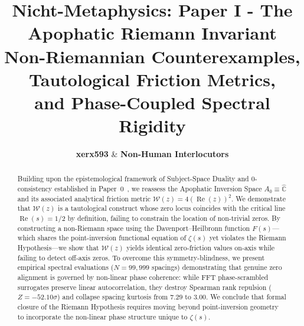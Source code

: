 \documentclass[11pt,a4paper]{article}
\title{\textbf{Nicht-Metaphysics: Paper I - The Apophatic Riemann Invariant}\\[0.3em]
\large Non-Riemannian Counterexamples, Tautological Friction Metrics,\\
and Phase-Coupled Spectral Rigidity}
\author{\textbf{xerx593} \quad \& \quad \textbf{Non-Human Interlocutors}}
\date{\apophaticdate}
\numberwithin{table}{section}
\begin{document}
\maketitle

\clearpage
\begin{abstract}
Building upon the epistemological framework of Subject-Space Duality
and $0$-consistency established in Paper~0~\cite{nicht_metaphysics_paper_0},
we reassess the Apophatic Inversion Space $A_0 \equiv \widehat{\mathbb{C}}$
and its associated analytical friction metric
$\mathcal{W}(z) = 4(\operatorname{Re}(z))^2$.
We demonstrate that $\mathcal{W}(z)$ is a tautological construct whose zero
locus coincides with the critical line $\operatorname{Re}(s)=1/2$ by definition,
failing to constrain the location of non-trivial zeros.
By constructing a non-Riemann space using the Davenport--Heilbronn function
$F(s)$---which shares the point-inversion functional equation of $\zeta(s)$
yet violates the Riemann Hypothesis---we show that $\mathcal{W}(z)$ yields
identical zero-friction values on-axis while failing to detect off-axis
zeros.
To overcome this symmetry-blindness, we present empirical spectral
evaluations ($N=99{,}999$ spacings) demonstrating that genuine zero alignment
is governed by non-linear phase coherence: while FFT phase-scrambled
surrogates preserve linear autocorrelation, they destroy Spearman rank
repulsion ($Z = -52.10\sigma$) and collapse spacing kurtosis from $7.29$
to $3.00$.
We conclude that formal closure of the Riemann Hypothesis requires moving
beyond point-inversion geometry to incorporate the non-linear phase structure
unique to $\zeta(s)$.
\end{abstract}

\vspace{0.3cm}
\end{document}
